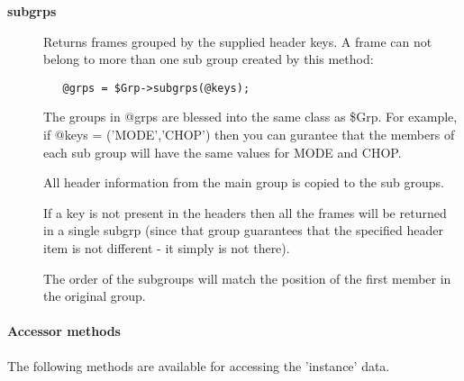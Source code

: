 \begin{description}
\item[{\textbf{subgrps}}] \mbox{}

Returns frames grouped by the supplied header keys.
A frame can not belong to more than one sub group created by this
method:

\begin{verbatim}
   @grps = $Grp->subgrps(@keys);
\end{verbatim}


The groups in @grps are blessed into the same class as \$Grp.
For example, if @keys = ('MODE','CHOP') then you can gurantee
that the members of each sub group will have the same values
for MODE and CHOP.



All header information from the main group is copied to the
sub groups.



If a key is not present in the headers then all the frames
will be returned in a single subgrp (since that group guarantees
that the specified header item is not different - it simply
is not there).



The order of the subgroups will match the position of the first
member in the original group.

\end{description}
\paragraph*{Accessor methods\label{ORAC::Group_Accessor_methods}}


The following methods are available for accessing the
'instance' data.

